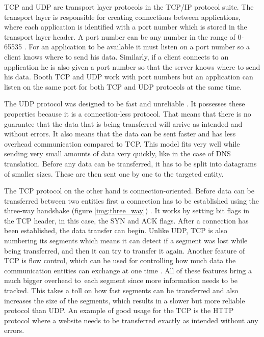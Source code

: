 TCP and UDP are transport layer protocols in the TCP/IP protocol suite. The transport layer is responsible for creating connections between applications, where each application is identified with a port number which is stored in the transport layer header. A port number can be any number in the range of 0-65535 \cite{Forouzan2010}. For an application to be available it must listen on a port number so a client knows where to send his data. Similarly, if a client connects to an application he is also given a port number so that the server knows where to send his data. Booth TCP and UDP work with port numbers but an application can listen on the same port for both TCP and UDP protocols at the same time.

The UDP protocol was designed to be fast and unreliable \cite{Forouzan2010}. It possesses these properties because it is a connection-less protocol. That means that there is no guarantee that the data that is being transferred will arrive as intended and without errors. It also means that the data can be sent faster and has less overhead communication compared to TCP. This model fits very well while sending very small amounts of data very quickly, like in the case of DNS translation. Before any data can be transferred, it has to be split into datagrams of smaller sizes. These are then sent one by one to the targeted entity.

The TCP protocol on the other hand is connection-oriented. Before data can be transferred between two entities first a connection has to be established using the three-way handshake (figure \ref{img:three_way}) \cite{Forouzan2010}. It works by setting bit flags in the TCP header, in this case, the SYN and ACK flags. After a connection has been established, the data transfer can begin. Unlike UDP, TCP is also numbering its segments which means it can detect if a segment was lost while being transferred, and then it can try to transfer it again. Another feature of TCP is flow control, which can be used for controlling how much data the communication entities can exchange at one time \cite{Forouzan2010}. All of these features bring a much bigger overhead to~each segment since more information needs to be tracked. This takes a toll on how fast segments can be transferred and also increases the size of the segments, which results in a slower but more reliable protocol than UDP. An example of good usage for the TCP is the HTTP protocol where a website needs to be transferred exactly as intended without any errors.

